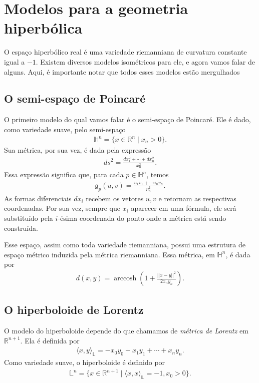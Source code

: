 \documentclass{article}
\DeclareMathOperator{\arccosh}{arccosh}
\begin{document}
\section{Modelos para a geometria hiperbólica}

O espaço hiperbólico real é uma variedade riemanniana de curvatura constante igual a $-1$. Existem diversos modelos isométricos para ele, e agora vamos falar de alguns. Aqui, é importante notar que todos esses modelos estão mergulhados 

\subsection{O semi-espaço de Poincaré}

O primeiro modelo do qual vamos falar é o semi-espaço de Poincaré. Ele é dado, como variedade suave, pelo semi-espaço \begin{align}
    \mathbb{H}^n = \{x \in \mathbb{R}^n \mid x_n > 0\}.
\end{align} Sua métrica, por sua vez, é dada pela expressão \begin{align}
    ds^2 = \frac{dx_1^2 + \cdots + dx_n^2}{x_n^2}.
\end{align} Essa expressão significa que, para cada $p \in \mathbb{H}^n$, temos \begin{align}
    \mathfrak{g}_p(u, v) = \frac{u_1v_1 + \cdots u_nv_n}{p_n^2}.
\end{align} As formas diferenciais $dx_i$ recebem os vetores $u, v$ e retornam as respectivas coordenadas. Por sua vez, sempre que $x_i$ aparecer em uma fórmula, ele será substituído pela $i$-ésima coordenada do ponto onde a métrica está sendo construída.

Esse espaço, assim como toda variedade riemanniana, possui uma estrutura de espaço métrico induzida pela métrica riemanniana. Essa métrica, em $\mathbb{H}^n$, é dada por \begin{align}
    d(x,y) = \arccosh\left(1 + \frac{||x - y||^2}{2x_ny_n}\right).
\end{align}

\subsection{O hiperboloide de Lorentz}

O modelo do hiperboloide depende do que chamamos de \textit{métrica de Lorentz} em $\mathbb{R}^{n+1}$. Ela é definida por \begin{align}
    \langle x, y \rangle_\mathbb{L} = -x_0y_0 + x_1y_1 + \cdots + x_ny_n.
\end{align} Como variedade suave, o hiperboloide é definido por \begin{align}
    \mathbb{L}^n = \{x \in \mathbb{R}^{n+1} \mid \langle x, x \rangle_\mathbb{L} = -1, x_0 > 0\}.
\end{align}
\end{document}
